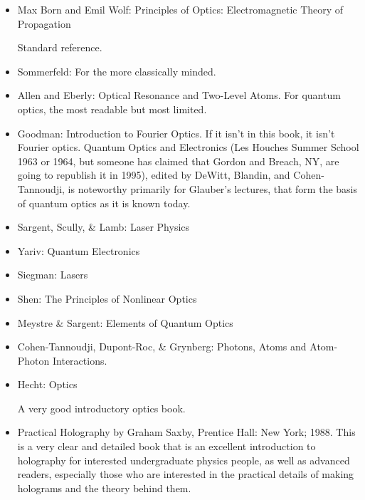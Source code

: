 \documentclass[10pt,a4paper]{book}
\theoremstyle{definition}
\begin{document}
\begin{itemize}
\item Max Born and Emil Wolf: Principles of Optics: Electromagnetic Theory of Propagation

Standard reference.

\item Sommerfeld: For the more classically minded.
\item Allen and Eberly: Optical Resonance and Two-Level Atoms.
For quantum optics, the most readable but most limited.
\item Goodman: Introduction to Fourier Optics.
If it isn't in this book, it isn't Fourier optics.
Quantum Optics and Electronics (Les Houches Summer School 1963 or 1964, but someone has claimed that Gordon and Breach, NY, are going to republish it in 1995), edited by DeWitt, Blandin, and Cohen- Tannoudji, is noteworthy primarily for Glauber's lectures, that form the basis of quantum optics as it is known today.
\item Sargent, Scully, \& Lamb: Laser Physics
\item Yariv: Quantum Electronics
\item Siegman: Lasers
\item Shen: The Principles of Nonlinear Optics
\item Meystre \& Sargent: Elements of Quantum Optics
\item Cohen-Tannoudji, Dupont-Roc, \& Grynberg: Photons, Atoms and Atom-Photon Interactions.
\item Hecht: Optics

A very good introductory optics book.

\item Practical Holography by Graham Saxby, Prentice Hall: New York; 1988.
This is a very clear and detailed book that is an excellent introduction to holography for interested undergraduate physics people, as well as advanced readers, especially those who are interested in the practical details of making holograms and the theory behind them.
\end{itemize}
\end{document}
